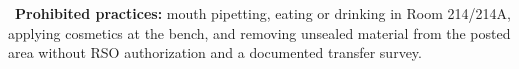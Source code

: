 \begin{tcolorbox}[colback=white,colframe=alertred,boxrule=0.8pt,arc=1.5pt,
  left=8pt,right=8pt,top=5pt,bottom=5pt]
\small\faExclamationTriangle\ \textbf{Prohibited practices:} mouth pipetting, eating or drinking
in Room 214/214A, applying cosmetics at the bench, and removing unsealed material from the
posted area without RSO authorization and a documented transfer survey.
\end{tcolorbox}
